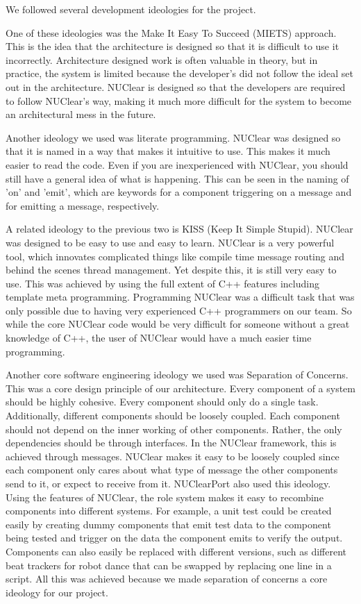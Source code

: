 \documentclass[english,12pt]{scrartcl}
\begin{document}
		We followed several development ideologies for the project.
		
		One of these ideologies was the Make It Easy To Succeed (MIETS) approach.
		This is the idea that the architecture is designed so that it is difficult to use it incorrectly.
		Architecture designed work is often valuable in theory, but in practice, the system is limited because the developer’s did not follow the ideal set out in the architecture.
		NUClear is designed so that the developers are required to follow NUClear’s way, making it much more difficult for the system to become an architectural mess in the future.

		Another ideology we used was literate programming.
		NUClear was designed so that it is named in a way that makes it intuitive to use.
		This makes it much easier to read the code.
		Even if you are inexperienced with NUClear, you should still have a general idea of what is happening.
		This can be seen in the naming of ’on’ and ’emit’, which are keywords for a component triggering on a message and for emitting a message, respectively.

		A related ideology to the previous two is KISS (Keep It Simple Stupid).
		NUClear was designed to be easy to use and easy to learn.
		NUClear is a very powerful tool, which innovates complicated things like compile time message routing and behind the scenes thread management.
		Yet despite this, it is still very easy to use.
		This was achieved by using the full extent of C++ features including template meta programming.
		Programming NUClear was a difficult task that was only possible due to having very experienced C++ programmers on our team.
		So while the core NUClear code would be very difficult for someone without a great knowledge of C++, the user of NUClear would have a much easier time programming.

		Another core software engineering ideology we used was Separation of Concerns.
		This was a core design principle of our architecture.
		Every component of a system should be highly cohesive.
		Every component should only do a single task.
		Additionally, different components should be loosely coupled.
		Each component should not depend on the inner working of other components.
		Rather, the only dependencies should be through interfaces.
		In the NUClear framework, this is achieved through messages.
		NUClear makes it easy to be loosely coupled since each component only cares about what type of message the other components send to it, or expect to receive from it.
		NUClearPort also used this ideology. Using the features of NUClear, the role system makes it easy to recombine components into different systems.
		For example, a unit test could be created easily by creating dummy components that emit test data to the component being tested and trigger on the data the component emits to verify the output.
		Components can also easily be replaced with different versions, such as different beat trackers for robot dance that can be swapped by replacing one line in a script. All this was achieved because we made separation of concerns a core ideology for our project. 
		
\end{document}
